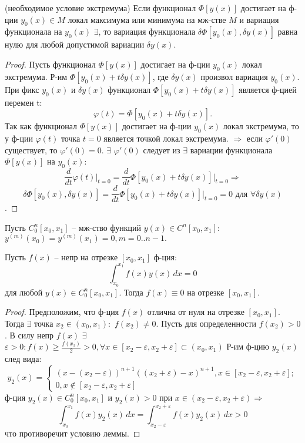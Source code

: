 \begin{theorem}(необходимое условие экстремума)
    Если функционал $\Phi[y(x)]$ достигает на ф-ции
    $y_0(x) \in M$ локал максимума или минимума на мж-стве $M$ и
    вариация функционала на $y_0(x)$ $\exists$, то вариация функционала $\delta\Phi[y_0(x), \delta y(x)]$ равна нулю для любой допустимой вариации $\delta y(x)$.
\end{theorem}
\begin{proof}
    Пусть функционал $\Phi[y(x)]$ достигает на ф-ции
    $y_0(x)$ локал экстремума. Р-им $\Phi[y_0(x) + t\delta y(x)]$, где $\delta y(x)$
    произвол вариация $y_0(x)$. При фикс $y_0(x)$ и $\delta y(x)$ функционал 
    $\Phi[y_0(x) + t\delta y(x)]$ является ф-цией перемен t:
    $$\varphi(t) = \Phi[y_0(x) + t\delta y(x)].$$
    Так как функционал $\Phi[y(x)]$ достигает на ф-ции $y_0(x)$ локал
    экстремума, то у ф-ции $\varphi(t)$ точка $t=0$ является точкой локал экстремума. $\Longrightarrow$ если $\varphi'(0)$ существует, то
    $\varphi'(0)=0$. $\exists$ $\varphi'(0)$ следует из $\exists$ вариации функционала $\Phi[y(x)]$ на $y_0(x)$: $$\frac{d}{dt}\varphi(t)\Big|_{t=0}=\frac{d}{dt}\Phi[y_0(x)+t\delta y(x)]\Big|_{t=0} \Longrightarrow$$
    $$\delta \Phi[y_0(x), \delta y(x)]=\frac{d}{dt}\Phi[y_0(x)+t\delta y(x)]\Big|_{t=0}=0 \text{ для } \forall \delta y(x)$$.
\end{proof}
Пусть $C^n_0 [x_0, x_1]$ -- мж-ство функций $y(x)\in C^n[x_0, x_1]:$ $y^{(m)}(x_0)=y^{(m)}(x_1)=0, m=0..n-1.$

\begin{lemma}
    Пусть $f(x)$ – непр на отрезке $[x_0, x_1]$ ф-ция: 
    $$ \int_{x_0}^{x_1} f(x)y(x) \,dx=0$$
    для любой $y(x) \in C^n_0[x_0, x_1]$. Тогда $f(x) \equiv 0$ на отрезке $[x_0, x_1]$.
\end{lemma}
\begin{proof}
    Предположим, что ф-ция $f(x)$ отлична от нуля на
    отрезке $[x_0, x_1]$. Тогда $\exists$ точка $x_2 \in (x_0, x_1):$ $f(x_2)\neq0$. Пусть для определенности $f(x_2)>0$. В силу непр $f(x)$ $\exists$ $\varepsilon > 0: f(x)\geq \frac{f(x_2)}{2}>0, \forall x \in [x_2 - \varepsilon, x_2 + \varepsilon] \subset (x_0, x_1)$
    Р-им ф-цию $y_2(x)$ след вида: 
    $$y_2(x)=\begin{cases} (x-(x_2-\varepsilon))^{n+1}((x_2+\varepsilon)-x)^{n+1}, x\in[x_2-\varepsilon, x_2+\varepsilon]; \\ 0,  x\notin[x_2-\varepsilon, x_2+\varepsilon] \end{cases}$$
    ф-ция $y_2(x) \in C^n_0[x_0, x_1]$ и $ y_2(x) > 0$ при $x\in(x_2 - \varepsilon, x_2 + \varepsilon) \Longrightarrow$
    $$\int_{x_0}^{x_1} f(x)y_2(x) \,dx=\int_{x_2-\varepsilon}^{x_2+\varepsilon} f(x)y_2(x) \,dx>0$$ что противоречит условию леммы.
\end{proof}

